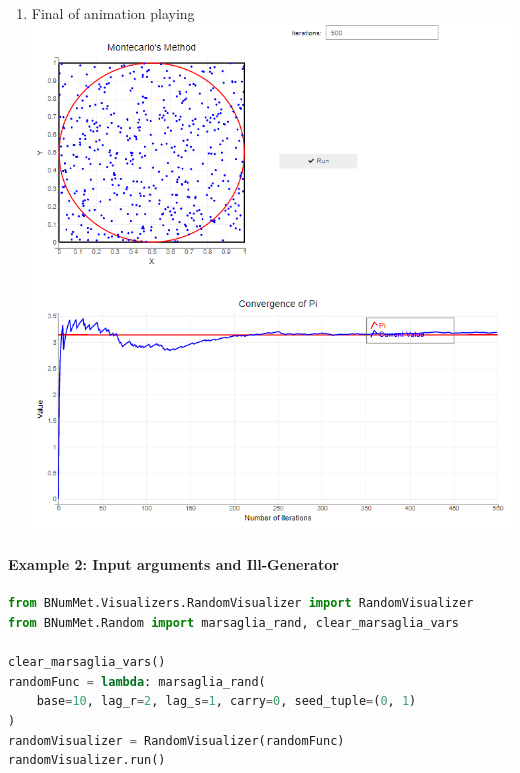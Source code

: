 \begin{enumerate}
    \item Final of animation playing\\
    \includegraphics[scale=0.7]{Include/Images/Thesis/Documentation/Visualizers/Randomness/Example 1/Example 1 - 03 - Finished.png}
\end{enumerate}


\paragraph{Example 2: Input arguments and Ill-Generator}
\begin{lstlisting}[language=Python]
from BNumMet.Visualizers.RandomVisualizer import RandomVisualizer
from BNumMet.Random import marsaglia_rand, clear_marsaglia_vars

clear_marsaglia_vars()
randomFunc = lambda: marsaglia_rand(
    base=10, lag_r=2, lag_s=1, carry=0, seed_tuple=(0, 1)
)
randomVisualizer = RandomVisualizer(randomFunc)
randomVisualizer.run()
\end{lstlisting}


